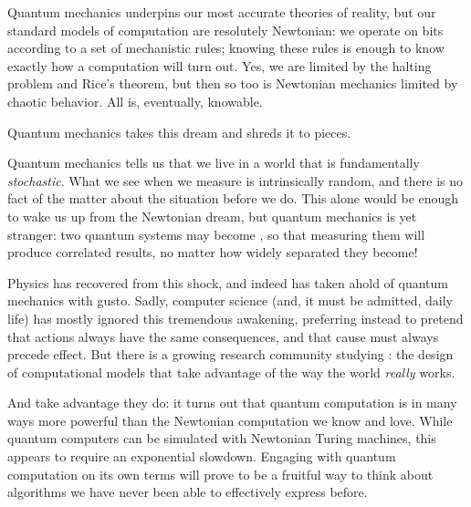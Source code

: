 Quantum mechanics underpins our most accurate theories of
reality,\footnotemark{} but our standard models of computation are resolutely
Newtonian: we operate on bits according to a set of mechanistic rules; knowing
these rules is enough to know exactly how a computation will turn out.  Yes, we
are limited by the halting problem and Rice's theorem, but then so too is
Newtonian mechanics limited by chaotic behavior.  All is, eventually, knowable.


Quantum mechanics takes this dream and shreds it to pieces. 

Quantum mechanics tells us that we live in a world that is fundamentally
\emph{stochastic}.  What we see when we measure is intrinsically random, and
there is no fact of the matter about the situation before we do.\footnotemark{}
This alone would be enough to wake us up from the Newtonian dream, but quantum
mechanics is yet stranger: two quantum systems may become , so
that measuring them will produce correlated results, no matter how widely
separated they become!


Physics has recovered from this shock, and indeed has taken ahold of quantum
mechanics with gusto.  Sadly, computer science (and, it must be admitted, daily
life) has mostly ignored this tremendous awakening, preferring instead to
pretend that actions always have the same consequences, and that cause must
always precede effect.  
But there is a growing research community studying
: the design of computational models that take advantage
of the way the world \emph{really} works.   

And take advantage they do: it turns out that quantum computation is in many ways more
powerful than the Newtonian computation we know and love.  While quantum
computers can be simulated with Newtonian Turing machines, this appears to
require an exponential slowdown.  \citeme{}  Engaging with quantum computation
on its own terms will prove to be a fruitful way to think about
algorithms we have never been able to effectively express before.


